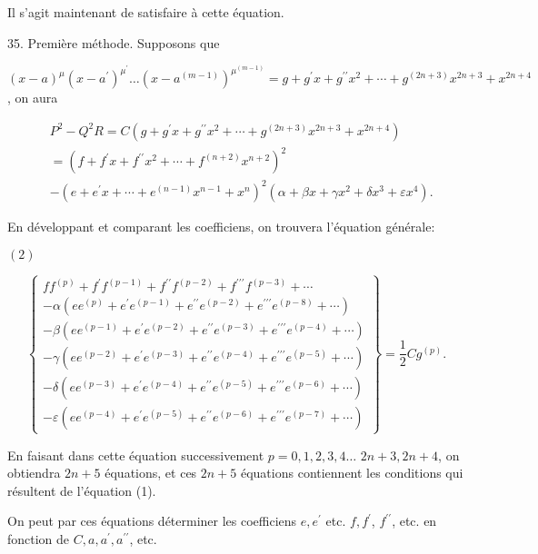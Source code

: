 \documentclass{article}
\begin{document}
Il s'agit maintenant de satisfaire à cette équation.

35. Première méthode. Supposons que

\((x-a)^{\mu}\left(x-a^{\prime}\right)^{\mu^{\prime}} \ldots\left(x-a^{(m-1)}\right)^{\mu^{(m-1)}}=g+g^{\prime} x+g^{\prime \prime} x^{2}+\cdots+g^{(2 n+3)} x^{2 n+3}+x^{2 n+4}\), on aura

\[
\begin{aligned}
& P^{2}-Q^{2} R=C\left(g+g^{\prime} x+g^{\prime \prime} x^{2}+\cdots+g^{(2 n+3)} x^{2 n+3}+x^{2 n+4}\right) \\
&=\left(f+f^{\prime} x+f^{\prime \prime} x^{2}+\cdots+f^{(n+2)} x^{n+2}\right)^{2} \\
&-\left(e+e^{\prime} x+\cdots+e^{(n-1)} x^{n-1}+x^{n}\right)^{2}\left(\alpha+\beta x+\gamma x^{2}+\delta x^{3}+\varepsilon x^{4}\right) .
\end{aligned}
\]

En développant et comparant les coefficiens, on trouvera l'équation générale:

\((2)\)

\[
\left\{\begin{array}{c}
f f^{(p)}+f^{\prime} f^{(p-1)}+f^{\prime \prime} f^{(p-2)}+f^{\prime \prime \prime} f^{(p-3)}+\cdots \\
-\alpha\left(e e^{(p)}+e^{\prime} e^{(p-1)}+e^{\prime \prime} e^{(p-2)}+e^{\prime \prime \prime} e^{(p-8)}+\cdots\right) \\
-\beta\left(e e^{(p-1)}+e^{\prime} e^{(p-2)}+e^{\prime \prime} e^{(p-3)}+e^{\prime \prime \prime} e^{(p-4)}+\cdots\right) \\
-\gamma\left(e e^{(p-2)}+e^{\prime} e^{(p-3)}+e^{\prime \prime} e^{(p-4)}+e^{\prime \prime \prime} e^{(p-5)}+\cdots\right) \\
-\delta\left(e e^{(p-3)}+e^{\prime} e^{(p-4)}+e^{\prime \prime} e^{(p-5)}+e^{\prime \prime \prime} e^{(p-6)}+\cdots\right) \\
-\varepsilon\left(e e^{(p-4)}+e^{\prime} e^{(p-5)}+e^{\prime \prime} e^{(p-6)}+e^{\prime \prime \prime} e^{(p-7)}+\cdots\right)
\end{array}\right\}=\frac{1}{2} C g^{(p)} .
\]

En faisant dans cette équation successivement \(p=0,1,2,3,4 \ldots\) \(2 n+3,2 n+4\), on obtiendra \(2 n+5\) équations, et ces \(2 n+5\) équations contiennent les conditions qui résultent de l'équation (1).

On peut par ces équations déterminer les coefficiens \(e, e^{\prime}\) etc. \(f, f^{\prime}\), \(f^{\prime \prime}\), etc. en fonction de \(C, a, a^{\prime}, a^{\prime \prime}\), etc.
\end{document}
